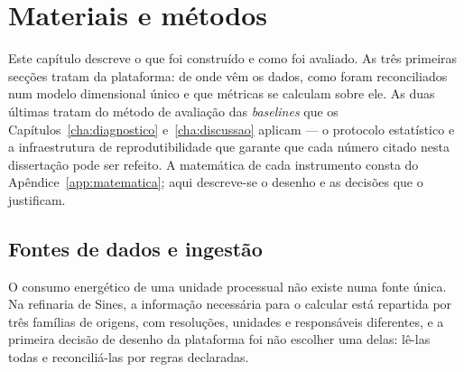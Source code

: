 
\chapter{Materiais e métodos}
\label{cha:metodos}

Este capítulo descreve o que foi construído e como foi avaliado. As três
primeiras secções tratam da plataforma: de onde vêm os dados, como foram
reconciliados num modelo dimensional único e que métricas se calculam sobre
ele. As duas últimas tratam do método de avaliação das \emph{baselines} que
os Capítulos~\ref{cha:diagnostico} e~\ref{cha:discussao} aplicam --- o
protocolo estatístico e a infraestrutura de reprodutibilidade que garante
que cada número citado nesta dissertação pode ser refeito. A matemática de
cada instrumento consta do Apêndice~\ref{app:matematica}; aqui descreve-se o
desenho e as decisões que o justificam.

\section{Fontes de dados e ingestão}
\label{sec:fontes}

O consumo energético de uma unidade processual não existe numa fonte
única. Na refinaria de Sines, a informação necessária para o calcular está
repartida por três famílias de origens, com resoluções, unidades e
responsáveis diferentes, e a primeira decisão de desenho da plataforma foi
não escolher uma delas: lê-las todas e reconciliá-las por regras
declaradas.

